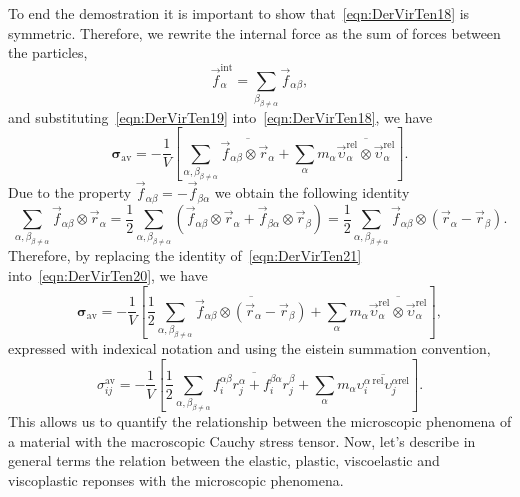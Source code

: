To end the demostration it is important to show that~\eqref{eqn:DerVirTen18} is symmetric.
Therefore, we rewrite the internal force as the sum of forces between the particles,
\begin{equation}
    \vec{f}^{\mathrm{int}}_\alpha = \sum_{{\beta}_{\beta\neq\alpha}}\vec{f}_{\alpha\beta}\label{eqn:DerVirTen19},
\end{equation}
and substituting~\eqref{eqn:DerVirTen19} into~\eqref{eqn:DerVirTen18}, we have
\begin{equation}
    \bm{\sigma}_{\mathrm{av}}
    =
    -\frac{1}{V}
    \left[
        \sum_{{\alpha,\beta}_{\beta\neq\alpha}}\overline{\vec{f}_{\alpha\beta}\otimes\vec{r}_\alpha}
        +
        \sum_\alpha m_\alpha\overline{\vec{\upsilon}_\alpha^{\mathrm{rel}}\otimes\vec{\upsilon}_\alpha^{\mathrm{rel}}}
    \right].\label{eqn:DerVirTen20}
\end{equation}
Due to the property $\vec{f}_{\alpha\beta}=-\vec{f}_{\beta\alpha}$ we obtain the following identity
\begin{equation}
    \sum_{{\alpha,\beta}_{\beta\neq\alpha}}\vec{f}_{\alpha\beta}\otimes\vec{r}_\alpha 
    =
    \frac{1}{2}\sum_{{\alpha,\beta}_{\beta\neq\alpha}}\left(\vec{f}_{\alpha\beta}\otimes\vec{r}_\alpha+\vec{f}_{\beta\alpha}\otimes\vec{r}_\beta\right)
    =
    \frac{1}{2}\sum_{{\alpha,\beta}_{\beta\neq\alpha}}\vec{f}_{\alpha\beta}\otimes\left(\vec{r}_\alpha-\vec{r}_\beta\right).\label{eqn:DerVirTen21}
\end{equation}
Therefore, by replacing the identity of~\eqref{eqn:DerVirTen21} into~\eqref{eqn:DerVirTen20}, we have
\begin{equation}
    \bm{\sigma}_{\mathrm{av}}
    =
    -\frac{1}{V}
    \left[
        \frac{1}{2}
        \sum_{{\alpha,\beta}_{\beta\neq\alpha}}\overline{\vec{f}_{\alpha\beta}\otimes\left(\vec{r}_\alpha-\vec{r}_\beta\right)}
        +
        \sum_\alpha m_\alpha\overline{\vec{\upsilon}_\alpha^{\mathrm{rel}}\otimes\vec{\upsilon}_\alpha^{\mathrm{rel}}}
    \right],\label{eqn:DerVirTen22}
\end{equation}
expressed with indexical notation and using the eistein summation convention,
\begin{equation}
    \sigma^{\mathrm{av}}_{ij}
    =
    -\frac{1}{V}
    \left[
        \frac{1}{2}
        \sum_{{\alpha,\beta}_{\beta\neq\alpha}}\overline{f^{\alpha\beta}_{i}r^\alpha_{j} + f^{\beta\alpha}_{i}r^\beta_{j}}
        +
        \sum_\alpha m_\alpha\overline{\upsilon^{\alpha~\mathrm{rel}}_{i}\upsilon^{\alpha{\mathrm{rel}}}_j}
    \right].\label{eqn:DerVirTen23}
\end{equation}
This allows us to quantify the relationship between the microscopic phenomena of a material with the macroscopic Cauchy stress tensor. 
Now, let's describe in general terms the relation between the elastic, plastic, viscoelastic and viscoplastic reponses with the microscopic phenomena.

